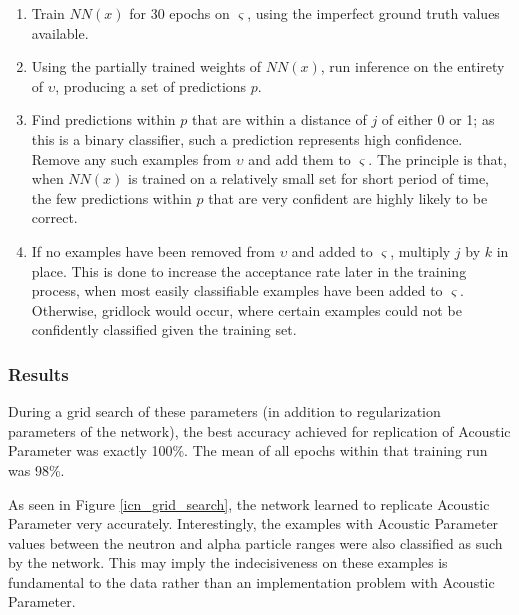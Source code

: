 \documentclass[10pt]{article}
\begin{document}
\begin{enumerate}
    \item Train $NN(x)$ for 30 epochs on $\varsigma$, using the imperfect ground truth values available.
    \item Using the partially trained weights of $NN(x)$, run inference on the entirety of $\upsilon$, producing a set of predictions $p$.
    \item Find predictions within $p$ that are within a distance of $j$ of either 0 or 1; as this is a binary classifier, such a prediction represents high confidence. Remove any such examples from $\upsilon$ and add them to $\varsigma$. The principle is that, when $NN(x)$ is trained on a relatively small set for short period of time, the few predictions within $p$ that are very confident are highly likely to be correct.
    \item If no examples have been removed from $\upsilon$ and added to $\varsigma$, multiply $j$ by $k$ in place. This is done to increase the acceptance rate later in the training process, when most easily classifiable examples have been added to $\varsigma$. Otherwise, gridlock would occur, where certain examples could not be confidently classified given the training set.
\end{enumerate}

\subsubsection{Results}

During a grid search of these parameters (in addition to regularization parameters of the network), the best accuracy achieved for replication of Acoustic Parameter was exactly 100\%. The mean of all epochs within that training run was 98\%.

As seen in Figure \ref{icn_grid_search}, the network learned to replicate Acoustic Parameter very accurately. Interestingly, the examples with Acoustic Parameter values between the neutron and alpha particle ranges were also classified as such by the network. This may imply the indecisiveness on these examples is fundamental to the data rather than an implementation problem with Acoustic Parameter.
\end{document}
